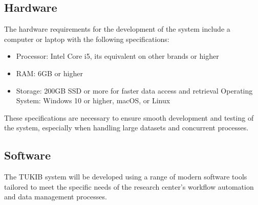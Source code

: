 \subsection{Hardware}

The hardware requirements for the development of the system include a computer or laptop with the following specifications:

\begin{itemize}
	\item Processor: Intel Core i5, its equivalent on other brands or higher
	\item RAM: 6GB or higher
	\item Storage: 200GB SSD or more for faster data access and retrieval
	Operating System: Windows 10 or higher, macOS, or Linux
\end{itemize}

These specifications are necessary to ensure smooth development and testing of the system, especially when handling large datasets and concurrent processes.

\subsection{Software}

The TUKIB system will be developed using a range of modern software tools tailored to meet the specific needs of the research center’s workflow automation and data management processes.


